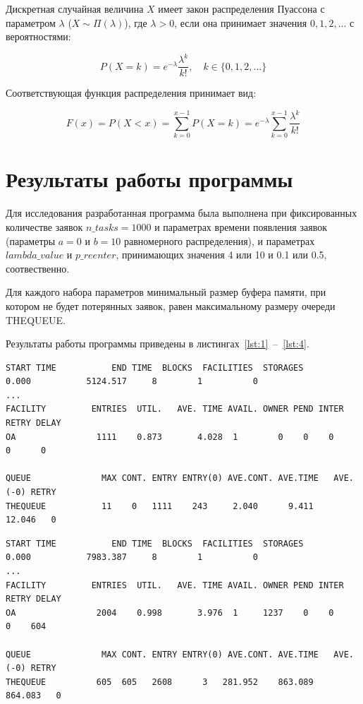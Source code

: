 \documentclass[14pt, a4paper]{extarticle}
\begin{document}
Дискретная случайная величина $X$ имеет закон распределения Пуассона с параметром $\lambda$ ($X \sim \Pi(\lambda)$), где $\lambda > 0$, если она принимает значения $0, 1, 2,...$ с вероятностями:

\begin{equation}
	P(X = k)= e^{-\lambda}\frac{\lambda^{k}}{k!}, \quad k \in \{0, 1, 2, ...\}
\end{equation}

Соответствующая функция распределения принимает вид:

\begin{equation}
	F(x) = P(X < x) = \sum_{k=0}^{x-1}P(X = k) = e^{-\lambda}\sum_{k=0}^{x-1}\frac{\lambda^{k}}{k!} 
\end{equation}




\section{Результаты работы программы}


Для исследования разработанная программа была выполнена при фиксированных количестве заявок $n\_tasks=1000$ и параметрах времени появления заявок (параметры $a=0$ и $b=10$ равномерного распределения), и параметрах $lambda\_value$ и $p\_reenter$, принимающих значения 4 или 10 и 0.1 или 0.5, соотвественно. 

Для каждого набора параметров минимальный размер буфера памяти, при котором не будет потерянных заявок, равен максимальному размеру очереди THEQUEUE.

Результаты работы программы приведены в листингах~\ref{lst:1}~--~\ref{lst:4}.

\begin{lstlisting}[caption = {Результат работы программы при $lambda\_value=4$ и $p\_reenter=0.1$ (максимальный размер очереди -- 11)}, label=lst:1]
START TIME           END TIME  BLOCKS  FACILITIES  STORAGES
0.000           5124.517     8        1          0
...
FACILITY         ENTRIES  UTIL.   AVE. TIME AVAIL. OWNER PEND INTER RETRY DELAY
OA                1111    0.873       4.028  1        0    0    0     0      0

QUEUE              MAX CONT. ENTRY ENTRY(0) AVE.CONT. AVE.TIME   AVE.(-0) RETRY
THEQUEUE           11    0   1111    243     2.040      9.411     12.046   0
\end{lstlisting}



\begin{lstlisting}[caption = {Результат работы программы при $lambda\_value=4$ и $p\_reenter=0.5$ (максимальный размер очереди -- 605)}, label=lst:2]
START TIME           END TIME  BLOCKS  FACILITIES  STORAGES
0.000           7983.387     8        1          0
...
FACILITY         ENTRIES  UTIL.   AVE. TIME AVAIL. OWNER PEND INTER RETRY DELAY
OA                2004    0.998       3.976  1     1237    0    0     0    604

QUEUE              MAX CONT. ENTRY ENTRY(0) AVE.CONT. AVE.TIME   AVE.(-0) RETRY
THEQUEUE          605  605   2608      3   281.952    863.089    864.083   0
\end{lstlisting}
\end{document}
